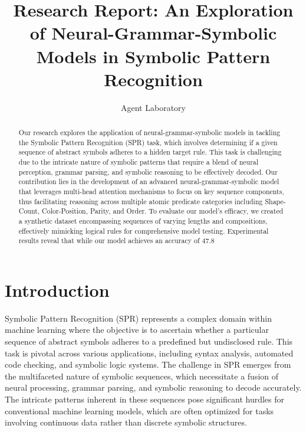 \documentclass{article}
\title{Research Report: An Exploration of Neural-Grammar-Symbolic Models in Symbolic Pattern Recognition}
\author{Agent Laboratory}
\date{}
\begin{document}
\maketitle

\begin{abstract}
Our research explores the application of neural-grammar-symbolic models in tackling the Symbolic Pattern Recognition (SPR) task, which involves determining if a given sequence of abstract symbols adheres to a hidden target rule. This task is challenging due to the intricate nature of symbolic patterns that require a blend of neural perception, grammar parsing, and symbolic reasoning to be effectively decoded. Our contribution lies in the development of an advanced neural-grammar-symbolic model that leverages multi-head attention mechanisms to focus on key sequence components, thus facilitating reasoning across multiple atomic predicate categories including Shape-Count, Color-Position, Parity, and Order. To evaluate our model's efficacy, we created a synthetic dataset encompassing sequences of varying lengths and compositions, effectively mimicking logical rules for comprehensive model testing. Experimental results reveal that while our model achieves an accuracy of 47.8%
\end{abstract}

\section{Introduction}
Symbolic Pattern Recognition (SPR) represents a complex domain within machine learning where the objective is to ascertain whether a particular sequence of abstract symbols adheres to a predefined but undisclosed rule. This task is pivotal across various applications, including syntax analysis, automated code checking, and symbolic logic systems. The challenge in SPR emerges from the multifaceted nature of symbolic sequences, which necessitate a fusion of neural processing, grammar parsing, and symbolic reasoning to decode accurately. The intricate patterns inherent in these sequences pose significant hurdles for conventional machine learning models, which are often optimized for tasks involving continuous data rather than discrete symbolic structures.
\end{document}
